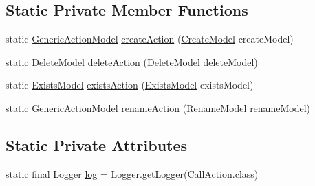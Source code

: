 \subsection*{Static Private Member Functions}
\begin{DoxyCompactItemize}
\item 
static \hyperlink{interfacecom_1_1poly_1_1nlp_1_1filekommander_1_1views_1_1models_1_1_generic_action_model}{Generic\-Action\-Model} \hyperlink{classcom_1_1poly_1_1nlp_1_1filekommander_1_1file_1_1actions_1_1_call_action_a9732d3e6e92378607607b7bd0bb91736}{create\-Action} (\hyperlink{classcom_1_1poly_1_1nlp_1_1filekommander_1_1views_1_1models_1_1_create_model}{Create\-Model} create\-Model)
\item 
static \hyperlink{classcom_1_1poly_1_1nlp_1_1filekommander_1_1views_1_1models_1_1_delete_model}{Delete\-Model} \hyperlink{classcom_1_1poly_1_1nlp_1_1filekommander_1_1file_1_1actions_1_1_call_action_ae2b04b022b8ec6d18419cc14d747972c}{delete\-Action} (\hyperlink{classcom_1_1poly_1_1nlp_1_1filekommander_1_1views_1_1models_1_1_delete_model}{Delete\-Model} delete\-Model)
\item 
static \hyperlink{classcom_1_1poly_1_1nlp_1_1filekommander_1_1views_1_1models_1_1_exists_model}{Exists\-Model} \hyperlink{classcom_1_1poly_1_1nlp_1_1filekommander_1_1file_1_1actions_1_1_call_action_ac68ec1fe48c2f90ab839762fa379cf89}{exists\-Action} (\hyperlink{classcom_1_1poly_1_1nlp_1_1filekommander_1_1views_1_1models_1_1_exists_model}{Exists\-Model} exists\-Model)
\item 
static \hyperlink{interfacecom_1_1poly_1_1nlp_1_1filekommander_1_1views_1_1models_1_1_generic_action_model}{Generic\-Action\-Model} \hyperlink{classcom_1_1poly_1_1nlp_1_1filekommander_1_1file_1_1actions_1_1_call_action_a11aae4f7ed1d404e8cd63c48ce91f427}{rename\-Action} (\hyperlink{classcom_1_1poly_1_1nlp_1_1filekommander_1_1views_1_1models_1_1_rename_model}{Rename\-Model} rename\-Model)
\end{DoxyCompactItemize}
\subsection*{Static Private Attributes}
\begin{DoxyCompactItemize}
\item 
static final Logger \hyperlink{classcom_1_1poly_1_1nlp_1_1filekommander_1_1file_1_1actions_1_1_call_action_a65b722d9482bd93c3ae2b31f51050a08}{log} = Logger.\-get\-Logger(Call\-Action.\-class)
\end{DoxyCompactItemize}


